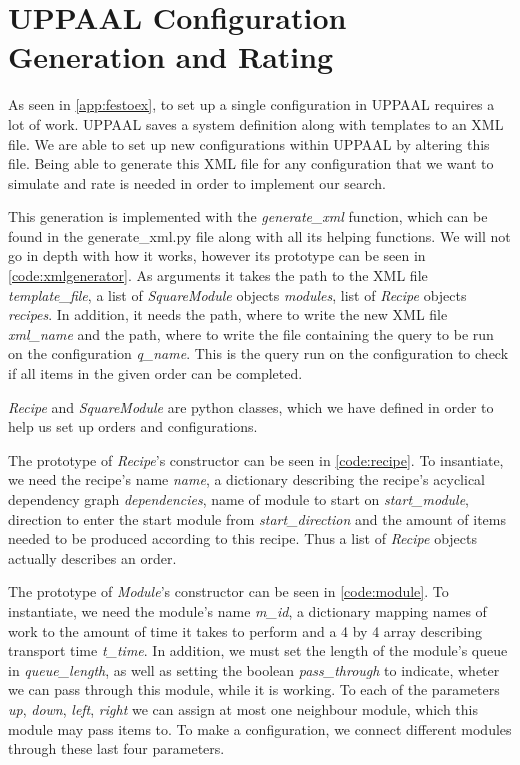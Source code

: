 \section{UPPAAL Configuration Generation and Rating}\label{sec:uppaalpython}
As seen in \cref{app:festoex}, to set up a single configuration in UPPAAL requires a lot of work. UPPAAL saves a system definition along with templates to an XML file. We are able to set up new configurations within UPPAAL by altering this file. Being able to generate this XML file for any configuration that we want to simulate and rate is needed in order to implement our search.

This generation is implemented with the \textit{generate\_xml} function, which can be found in the generate\_xml.py file along with all its helping functions. We will not go in depth with how it works, however its prototype can be seen in \cref{code:xmlgenerator}. As arguments it takes the path to the XML file \textit{template\_file}, a list of \textit{SquareModule} objects \textit{modules}, list of \textit{Recipe} objects \textit{recipes}. In addition, it needs the path, where to write the new XML file \textit{xml\_name} and the path, where to write the file containing the query to be run on the configuration \textit{q\_name}. This is the query run on the configuration to check if all items in the given order can be completed. 



\textit{Recipe} and \textit{SquareModule} are python classes, which we have defined in order to help us set up orders and configurations. 

The prototype of \textit{Recipe}'s constructor can be seen in \cref{code:recipe}. To insantiate, we need the recipe's name \textit{name}, a dictionary describing the recipe's acyclical dependency graph \textit{dependencies}, name of module to start on \textit{start\_module}, direction to enter the start module from \textit{start\_direction} and the amount of items needed to be produced according to this recipe. Thus a list of \textit{Recipe} objects actually describes an order.



The prototype of \textit{Module}'s constructor can be seen in \cref{code:module}. To instantiate, we need the module's name \textit{m\_id}, a dictionary mapping names of work to the amount of time it takes to perform and a 4 by 4 array describing transport time \textit{t\_time}. In addition, we must set the length of the module's queue in \textit{queue\_length}, as well as setting the boolean \textit{pass\_through} to indicate, wheter we can pass through this module, while it is working. To each of the parameters \textit{up}, \textit{down}, \textit{left}, \textit{right} we can assign at most one neighbour module, which this module may pass items to. To make a configuration, we connect different modules through these last four parameters.

